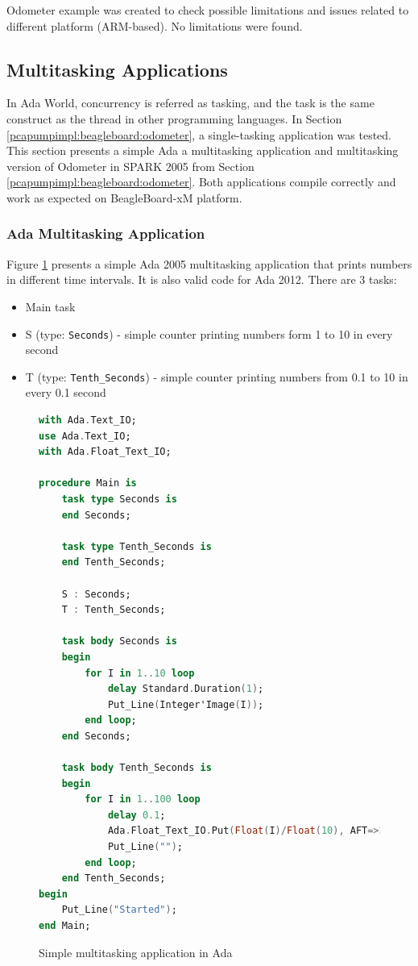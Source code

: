 Odometer example was created to check possible limitations and issues related to different platform (ARM-based). No limitations were found.


\subsection{Multitasking Applications}
\label{pcapumpimpl:beagleboard:multitasking}

In Ada World, concurrency is referred as tasking, and the task is the same construct as the thread in other programming languages. In Section \ref{pcapumpimpl:beagleboard:odometer}, a single-tasking application was tested. This section presents a simple Ada a multitasking application and multitasking version of Odometer in SPARK 2005 from Section \ref{pcapumpimpl:beagleboard:odometer}. Both applications compile correctly and work as expected on BeagleBoard-xM platform.

\subsubsection{Ada Multitasking Application}

Figure \ref{listing:HelloTasking} presents a simple Ada 2005 multitasking application that prints numbers in different time intervals. It is also valid code for Ada 2012. There are 3 tasks:
\begin{itemize}
    \item Main task
    \item S (type: \lstinline{Seconds}) - simple counter printing numbers form 1 to 10 in every second
    \item T (type: \lstinline{Tenth_Seconds}) - simple counter printing numbers from 0.1 to 10 in every 0.1 second
\end{itemize}

\begin{figure}[ht]
\singlespacing
\begin{lstlisting}[language=ada, frame=single, gobble=0]
with Ada.Text_IO;
use Ada.Text_IO;
with Ada.Float_Text_IO;

procedure Main is
    task type Seconds is
    end Seconds;

    task type Tenth_Seconds is
    end Tenth_Seconds;

    S : Seconds;
    T : Tenth_Seconds;

    task body Seconds is
    begin
        for I in 1..10 loop
            delay Standard.Duration(1);
            Put_Line(Integer'Image(I));
        end loop;
    end Seconds;

    task body Tenth_Seconds is
    begin
        for I in 1..100 loop            
            delay 0.1;            
            Ada.Float_Text_IO.Put(Float(I)/Float(10), AFT=>2, EXP=>0);
            Put_Line("");
        end loop;
    end Tenth_Seconds;
begin
    Put_Line("Started");
end Main;
\end{lstlisting} 
\doublespacing
\caption{Simple multitasking application in Ada}
\label{listing:HelloTasking}
\end{figure}

